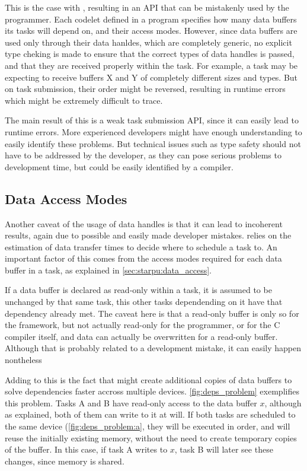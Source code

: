 \documentclass[main.tex]{subfiles}
\begin{document}
This is the case with \starpu, resulting in an API that can be mistakenly used by the programmer. Each codelet defined in a program specifies how many data buffers its tasks will depend on, and their access modes. However, since data buffers are used only through their data hanldes, which are completely generic, no explicit type cheking is made to ensure that the correct types of data handles is passed, and that they are received properly within the task. For example, a task may be expecting to receive buffers X and Y of completely different sizes and types. But on task submission, their order might be reversed, resulting in runtime errors which might be extremely difficult to trace.

The main result of this is a weak task submission API, since it can easily lead to runtime errors. More experienced developers might have enough understanding to easily identify these problems. But technical issues such as type safety should not have to be addressed by the developer, as they can pose serious problems to development time, but could be easily identified by a compiler.

\subsection{Data Access Modes}

Another caveat of the usage of data handles is that it can lead to incoherent results, again due to possible and easily made developer mistakes. \starpu relies on the estimation of data transfer times to decide where to schedule a task to. An important factor of this comes from the access modes required for each data buffer in a task, as explained in \cref{sec:starpu:data_access}.

If a data buffer is declared as read-only within a task, it is assumed to be unchanged by that same task, this other tasks dependending on it have that dependency already met.
The caveat here is that a read-only buffer is only so for the framework, but not actually read-only for the programmer, or for the C compiler itself, and data can actually be overwritten for a read-only buffer. Although that is probably related to a development mistake, it can easily happen nontheless

Adding to this is the fact that \starpu might create additional copies of data buffers to solve dependencies faster accross multiple devices. \cref{fig:deps_problem} exemplifies this problem. Tasks A and B have read-only access to the data buffer $x$, although as explained, both of them can write to it at will. If both tasks are scheduled to the same device (\cref{fig:deps_problem:a}, they will be executed in order, and \starpu will reuse the initially existing memory, without the need to create temporary copies of the buffer. In this case, if task A writes to $x$, task B will later see these changes, since memory is shared.
\end{document}
